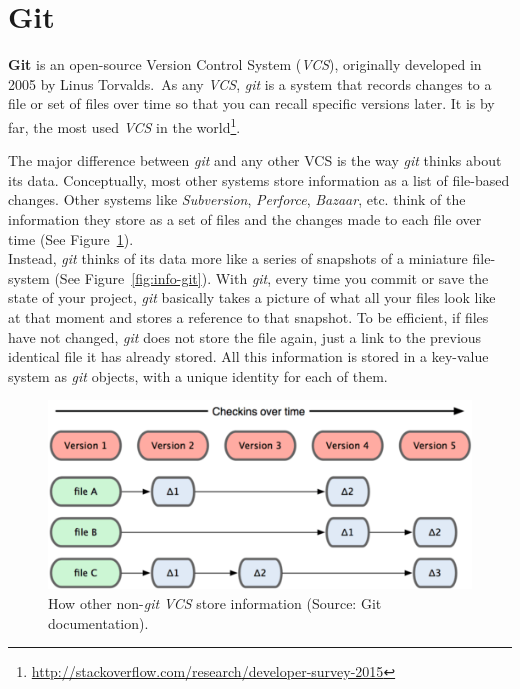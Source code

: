 \documentclass[a4paper, 12pt]{book}
\begin{document}
\section{Git}
\label{sec:git}
\textbf{Git} is an open-source Version Control System (\emph{VCS}), originally developed in 2005 by Linus Torvalds.\
As any \emph{VCS}, \emph{git} is a system that records changes to a file or set of files over time
so that you can recall specific versions later.
It is by far, the most used \emph{VCS} in the world\footnote{\url{http://stackoverflow.com/research/developer-survey-2015}}.\par
The major difference between \emph{git} and any other VCS is the way \emph{git} thinks about its data.
Conceptually, most other systems store information as a list of file-based changes. Other systems like \textit{Subversion},
\textit{Perforce}, \textit{Bazaar}, etc. think of the information they store as a set of files and the changes made to each
file over time (See Figure~\ref{fig:info-not-git}).\\
Instead, \emph{git} thinks of its data more like a series of snapshots of a miniature file-system (See Figure~\ref{fig:info-git}).
With \emph{git}, every time you commit or save the state of your project, \emph{git} basically takes a picture of what all
your files look like at that moment and stores a reference to that snapshot. To be efficient, if files have not changed,
\emph{git} does not store the file again, just a link to the previous identical file it has already stored.
All this information is stored in a key-value system as \emph{git} objects, with a unique identity for each of them.
\begin{figure}
  \centering
  \includegraphics[width=12cm, keepaspectratio]{img/deltas-not-git}
  \caption{How other non-\emph{git} \emph{VCS} store information (Source: Git documentation).}
  \label{fig:info-not-git}
\end{figure}
\end{document}
